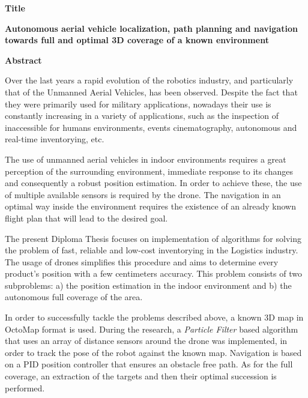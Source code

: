 {\selectfont

{}


\begin{center}
  \centering
  \textbf{\Large{Title}}
  \vspace{0.5cm}

  \textbf{\large{Autonomous aerial vehicle localization, path planning and navigation towards full and optimal 3D coverage of a known environment}}

  \vspace{1cm}

  \centering
  \textbf{Abstract}
\end{center} 

Over the last years a rapid evolution of the robotics industry, and particularly that of the Unmanned Aerial Vehicles, has been observed. Despite the fact that they were primarily used for military applications, nowadays their use is constantly increasing in a variety of applications, such as the inspection of inaccessible for humans environments, events cinematography, autonomous and real-time inventorying, etc.

The use of unmanned aerial vehicles in indoor environments requires a great perception of the surrounding environment, immediate response to its changes and consequently a robust position estimation. In order to achieve these, the use of multiple available sensors is required by the drone. The navigation in an optimal way inside the environment requires the existence of an already known flight plan that will lead to the desired goal.

The present Diploma Thesis focuses on implementation of algorithms for solving the problem of fast, reliable and low-cost inventorying in the Logistics industry. The usage of drones simplifies this procedure and aims to determine every product's position with a few centimeters accuracy. This problem consists of two subproblems: a) the position estimation in the indoor environment and b) the autonomous full coverage of the area.

In order to successfully tackle the problems described above, a known 3D map in OctoMap format is used. During the research, a \emph{Particle Filter} based algorithm that uses an array of distance sensors around the drone was implemented, in order to track the pose of the robot against the known map. Navigation is based on a PID position controller that ensures an obstacle free path. As for the full coverage, an extraction of the targets and then their optimal succession is performed.

}
